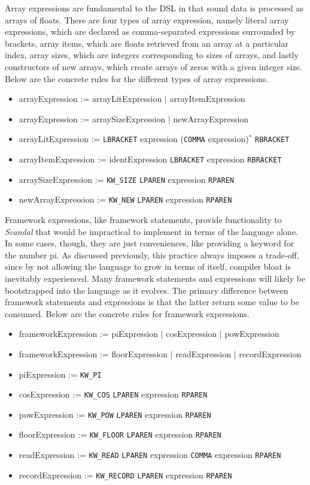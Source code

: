 Array expressions are fundamental to the DSL in that sound data is processed as arrays of floats. There are four types of array expression, namely literal array expressions, which are declared as comma-separated expressions surrounded by brackets, array items, which are floats retrieved from an array at a particular index, array sizes, which are integers corresponding to sizes of arrays, and lastly constructors of new arrays, which create arrays of zeros with a given integer size. Below are the concrete rules for the different types of array expressions.

\begin{itemize}
	\item arrayExpression := arrayLitExpression $|$ arrayItemExpression
	\item arrayExpression := arraySizeExpression $|$ newArrayExpression
	\item arrayLitExpression := \texttt{LBRACKET} expression (\texttt{COMMA} expression)$^*$ \texttt{RBRACKET}
	\item arrayItemExpression := identExpression \texttt{LBRACKET} expression \texttt{RBRACKET}
	\item arraySizeExpression := \texttt{KW\_SIZE} \texttt{LPAREN} expression \texttt{RPAREN}
	\item newArrayExpression := \texttt{KW\_NEW} \texttt{LPAREN} expression \texttt{RPAREN}
\end{itemize}

Framework expressions, like framework statements, provide functionality to \emph{Scandal} that would be impractical to implement in terms of the language alone. In some cases, though, they are just conveniences, like providing a keyword for the number pi. As discussed previously, this practice always imposes a trade-off, since by not allowing the language to grow in terms of itself, compiler bloat is inevitably experienced. Many framework statements and expressions will likely be bootstrapped into the language as it evolves. The primary difference between framework statements and expressions is that the latter return some value to be consumed. Below are the concrete rules for framework expressions.

\begin{itemize}
	\item frameworkExpression := piExpression $|$ cosExpression $|$ powExpression
	\item frameworkExpression := floorExpression $|$ readExpression $|$ recordExpression
	\item piExpression := \texttt{KW\_PI}
	\item cosExpression := \texttt{KW\_COS} \texttt{LPAREN} expression \texttt{RPAREN}
	\item powExpression := \texttt{KW\_POW} \texttt{LPAREN} expression \texttt{RPAREN}
	\item floorExpression := \texttt{KW\_FLOOR} \texttt{LPAREN} expression \texttt{RPAREN}
	\item readExpression := \texttt{KW\_READ} \texttt{LPAREN} expression \texttt{COMMA} expression \texttt{RPAREN}
	\item recordExpression := \texttt{KW\_RECORD} \texttt{LPAREN} expression \texttt{RPAREN}
\end{itemize}

